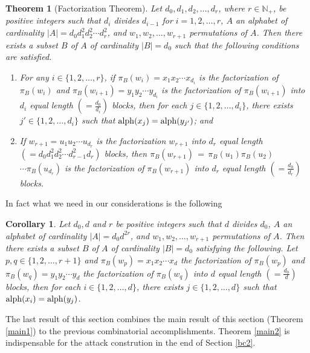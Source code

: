 \documentclass[submission,copyright,creativecommons]{eptcs}
\newcommand{\N}{\mathbb N}
\newcommand{\alp}{{\rm alph}}
\newtheorem{theorem}{Theorem}
\newtheorem{corollary}{Corollary}
\begin{document}
\begin{theorem}[Factorization Theorem] \label{perint}
Let $d_0,d_1,d_2,\ldots, d_r$, where $r\in\N_+$, be positive integers
such that $d_i$ divides $d_{i-1}$ for $i=1,2,\ldots,r$, $A$ an
alphabet of cardinality $|A|=d_0d_1^2d_2^2\cdots d_r^2$, and
$w_1,w_2,\ldots,w_{r+1}$ permutations of $A$. Then there exists a
subset $B$ of $A$ of cardinality $|B|=d_0$ such that the following
conditions are satisfied.
\begin{enumerate}
\item[\upshape{(1)}] For any $i\in\{1,2,\ldots,r\}$, if
  $\pi_B(w_i)=x_1x_2\cdots x_{d_i}$ is the factorization of 
  $\pi_B(w_i)$ and $\pi_B(w_{i+1})=y_1y_2\cdots y_{d_i}$ is the
  factorization of $\pi_B(w_{i+1})$ into $d_i$ equal length
  $(=\frac{d_0}{d_i})$ blocks, then for each $j\in\{1,2,\ldots,d_i\}$,
  there exists $j'\in\{1,2,\ldots,d_i\}$ such that
  $\alp(x_j)=\alp(y_{j'})$; and
\item[\upshape{(2)}] If $w_{r+1}=u_1u_2\cdots u_{d_r}$ is the factorization $w_{r+1}$ into $d_r$ equal length
  $(=d_0d_1^2d_2^2\cdots d_{r-1}^2d_r)$ blocks, then   $\pi_B(w_{r+1})\,=\,\pi_B(u_1)\pi_B(u_2)$ $\cdots \pi_B(u_{d_r})$
  is the factorization of $\pi_B(w_{r+1})$
  into $d_r$ equal length $(=\frac{d_0}{d_r})$ blocks.
\end{enumerate}
\end{theorem}

In fact what we need in our considerations is the following 

\begin{corollary}
Let $d_0, d$ and $r$ be positive integers such that $d$ divides $d_0$, $A$ an
alphabet of cardinality $|A|=d_0d^{2r}$, and
$w_1,w_2,\ldots,w_{r+1}$ permutations of $A$. Then there exists a
subset $B$ of $A$ of cardinality $|B|=d_0$ satisfying the following. Let $p,q\in\{1,2,\ldots,r+1\}$ and $\pi_B(w_p)=x_1x_2\cdots x_{d}$ the factorization of $\pi_B(w_p)$ and $\pi_B(w_q)=y_1y_2\cdots y_{d}$ the   factorization of $\pi_B(w_q)$ into $d$ equal length $(=\frac{d_0}{d})$ blocks, then for each $i\in\{1,2,\ldots,d\}$, there exists $j\in\{1,2,\ldots,d\}$ such that $\alp(x_i)=\alp(y_j)$.
\end{corollary}

The last result of this section combines the main result of this section (Theorem \ref{main1}) to the previous combinatorial accomplishments. Theorem \ref{main2} is indispensable for the attack constrution in the end of Section \ref{bc2}.
\end{document}
